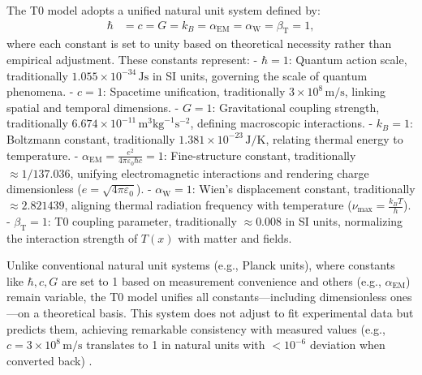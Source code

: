 \documentclass[12pt,a4paper]{article}
\newcommand{\Tfield}{T(x)}
\newcommand{\alphaEM}{\alpha_{\text{EM}}}
\newcommand{\alphaW}{\alpha_{\text{W}}}
\newcommand{\betaT}{\beta_{\text{T}}}
\begin{document}
	The T0 model adopts a unified natural unit system defined by:
	\begin{align}
		\hbar &= c = G = k_B = \alphaEM = \alphaW = \betaT = 1,
		\label{eq:unit_system}
	\end{align}
	where each constant is set to unity based on theoretical necessity rather than empirical adjustment. These constants represent:
	- \(\hbar = 1\): Quantum action scale, traditionally \(1.055 \times 10^{-34} \, \text{Js}\) in SI units, governing the scale of quantum phenomena.
	- \(c = 1\): Spacetime unification, traditionally \(3 \times 10^8 \, \text{m/s}\), linking spatial and temporal dimensions.
	- \(G = 1\): Gravitational coupling strength, traditionally \(6.674 \times 10^{-11} \, \text{m}^3\text{kg}^{-1}\text{s}^{-2}\), defining macroscopic interactions.
	- \(k_B = 1\): Boltzmann constant, traditionally \(1.381 \times 10^{-23} \, \text{J/K}\), relating thermal energy to temperature.
	- \(\alphaEM = \frac{e^2}{4\pi\varepsilon_0\hbar c} = 1\): Fine-structure constant, traditionally \(\approx 1/137.036\), unifying electromagnetic interactions and rendering charge dimensionless (\(e = \sqrt{4\pi\varepsilon_0}\)).
	- \(\alphaW = 1\): Wien’s displacement constant, traditionally \(\approx 2.821439\), aligning thermal radiation frequency with temperature (\(\nu_{\text{max}} = \frac{k_B T}{h}\)).
	- \(\betaT = 1\): T0 coupling parameter, traditionally \(\approx 0.008\) in SI units, normalizing the interaction strength of \(\Tfield\) with matter and fields.
	
	Unlike conventional natural unit systems (e.g., Planck units), where constants like \(\hbar, c, G\) are set to 1 based on measurement convenience and others (e.g., \(\alphaEM\)) remain variable, the T0 model unifies all constants—including dimensionless ones—on a theoretical basis. This system does not adjust to fit experimental data but predicts them, achieving remarkable consistency with measured values (e.g., \(c = 3 \times 10^8 \, \text{m/s}\) translates to 1 in natural units with \(< 10^{-6}\) deviation when converted back) \cite{pascher_alphabeta_2025}.
	
\end{document}
